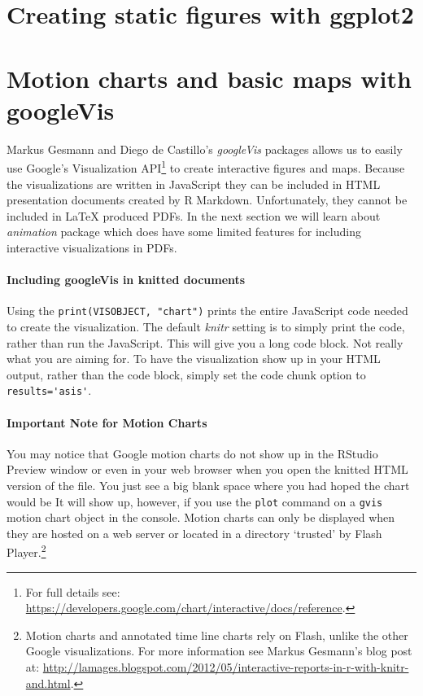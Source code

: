 \section{Creating static figures with ggplot2}

\section{Motion charts and basic maps with googleVis}

Markus Gesmann and Diego de Castillo's \emph{googleVis} packages allows us to easily use Google's Visualization API\footnote{For full details see: \url{https://developers.google.com/chart/interactive/docs/reference}.} to create interactive figures and maps. Because the visualizations are written in JavaScript they can be included in HTML presentation documents created by R Markdown. Unfortunately, they cannot be included in LaTeX produced PDFs. In the next section we will learn about \emph{animation} package which does have some limited features for including interactive visualizations in PDFs. 



\paragraph{Including googleVis in knitted documents}

Using the \verb|print(VISOBJECT, "chart")| prints the entire JavaScript code needed to create the visualization. The default \emph{knitr} setting is to simply print the code, rather than run the JavaScript. This will give you a long code block. Not really what you are aiming for. To have the visualization show up in your HTML output, rather than the code block, simply set the code chunk option to \verb|results='asis'|. 

\paragraph{Important Note for Motion Charts}

You may notice that Google motion charts do not show up in the RStudio Preview window or even in your web browser when you open the knitted HTML version of the file. You just see a big blank space where you had hoped the chart would be It will show up, however, if you use the \verb|plot| command on a \verb|gvis| motion chart object in the console. Motion charts can only be displayed when they are hosted on a web server or located in a directory `trusted' by Flash Player.\footnote{Motion charts and annotated time line charts rely on Flash, unlike the other Google visualizations. For more information see Markus Gesmann's blog post at: \url{http://lamages.blogspot.com/2012/05/interactive-reports-in-r-with-knitr-and.html}.}

